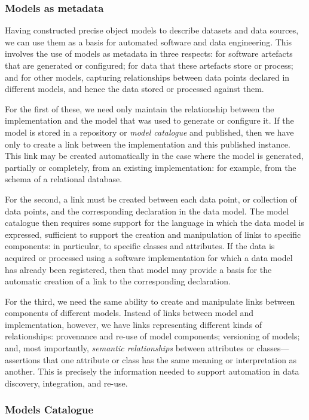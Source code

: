 \subsubsection{Models as metadata}

Having constructed precise object models to describe datasets and data
sources, we can use them as a basis for automated software and data
engineering.  This involves the use of models as metadata in three
respects: for software artefacts that are generated or configured; for
data that these artefacts store or process; and for other models,
capturing relationships between data points declared in different
models, and hence the data stored or processed against them.

For the first of these, we need only maintain the relationship between
the implementation and the model that was used to generate or
configure it.  If the model is stored in a repository or \emph{model
  catalogue} and published, then we have only to create a link between
the implementation and this published instance.  This link may be
created automatically in the case where the model is generated,
partially or completely, from an existing implementation: for example,
from the schema of a relational database.

For the second, a link must be created between each data point, or
collection of data points, and the corresponding declaration in the
data model.  The model catalogue then requires some support for the
language in which the data model is expressed, sufficient to support
the creation and manipulation of links to specific components: in
particular, to specific classes and attributes.  If the data is
acquired or processed using a software implementation for which a data
model has already been registered, then that model may provide a basis
for the automatic creation of a link to the corresponding declaration.

For the third, we need the same ability to create and manipulate links
between components of different models.  Instead of links between
model and implementation, however, we have links representing
different kinds of relationships: provenance and re-use of model
components; versioning of models; and, most importantly,
\emph{semantic relationships} between attributes or
classes---assertions that one attribute or class has the same meaning
or interpretation as another.  This is precisely the information
needed to support automation in data discovery, integration, and
re-use.

\subsubsection{Models Catalogue}

